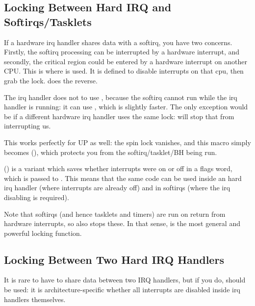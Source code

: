\documentclass[a4paper,8pt,english]{sphinxmanual}
\begin{document}
\subsection{Locking Between Hard IRQ and Softirqs/Tasklets}
\label{kernel-hacking/locking:locking-between-hard-irq-and-softirqs-tasklets}
If a hardware irq handler shares data with a softirq, you have two
concerns. Firstly, the softirq processing can be interrupted by a
hardware interrupt, and secondly, the critical region could be entered
by a hardware interrupt on another CPU. This is where
 is used. It is defined to disable
interrupts on that cpu, then grab the lock.
 does the reverse.

The irq handler does not to use , because
the softirq cannot run while the irq handler is running: it can use
, which is slightly faster. The only exception
would be if a different hardware irq handler uses the same lock:
 will stop that from interrupting us.

This works perfectly for UP as well: the spin lock vanishes, and this
macro simply becomes 
(), which protects you from the softirq/tasklet/BH
being run.

 () is a
variant which saves whether interrupts were on or off in a flags word,
which is passed to . This means
that the same code can be used inside an hard irq handler (where
interrupts are already off) and in softirqs (where the irq disabling is
required).

Note that softirqs (and hence tasklets and timers) are run on return
from hardware interrupts, so  also stops
these. In that sense,  is the most
general and powerful locking function.


\subsection{Locking Between Two Hard IRQ Handlers}
\label{kernel-hacking/locking:locking-between-two-hard-irq-handlers}
It is rare to have to share data between two IRQ handlers, but if you
do,  should be used: it is
architecture-specific whether all interrupts are disabled inside irq
handlers themselves.
\end{document}
